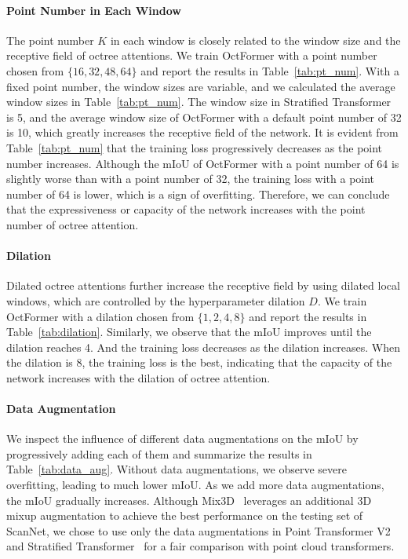 \documentclass[acmtog,screen,authorversion]{acmart}
\begin{document}
\paragraph{Point Number in Each Window}
The point number $K$ in each window is closely related to the window size and the receptive field of octree attentions.
We train OctFormer with a point number chosen from $\{16, 32, 48, 64\}$ and report the results in Table~\ref{tab:pt_num}.
With a fixed point number, the window sizes are variable, and we calculated the average window sizes in Table~\ref{tab:pt_num}.
The window size in Stratified Transformer~\cite{Lai2022} is 5, and the average window size of OctFormer with a default point number of 32 is 10, which greatly increases the receptive field of the network.
It is evident from Table~\ref{tab:pt_num} that the training loss progressively decreases as the point number increases.
Although the mIoU of OctFormer with a point number of 64 is slightly worse than with a point number of 32, the training loss with a point number of 64 is lower, which is a sign of overfitting.
Therefore, we can conclude that the expressiveness or capacity of the network increases with the point number of octree attention.



\paragraph{Dilation}
Dilated octree attentions further increase the receptive field by using dilated local windows, which are controlled by the hyperparameter dilation $D$.
We train OctFormer with a dilation chosen from $\{1, 2, 4, 8\}$ and report the results in Table~\ref{tab:dilation}.
Similarly, we observe that the mIoU improves until the dilation reaches 4.
And the training loss decreases as the dilation increases.
When the dilation is 8, the training loss is the best, indicating that the capacity of the network increases with the dilation of octree attention.

\paragraph{Data Augmentation}
We inspect the influence of different data augmentations on the mIoU by progressively adding each of them and summarize the results in Table~\ref{tab:data_aug}.
Without data augmentations, we observe severe overfitting, leading to much lower mIoU.
As we add more data augmentations, the mIoU gradually increases.
Although Mix3D~\cite{Nekrasov2021} leverages an additional 3D mixup augmentation to achieve the best performance on the testing set of ScanNet, we chose to use only the data augmentations in Point Transformer V2~\cite{Wu2022} and Stratified Transformer~\cite{Lai2022} for a fair comparison with point cloud transformers.
\end{document}
